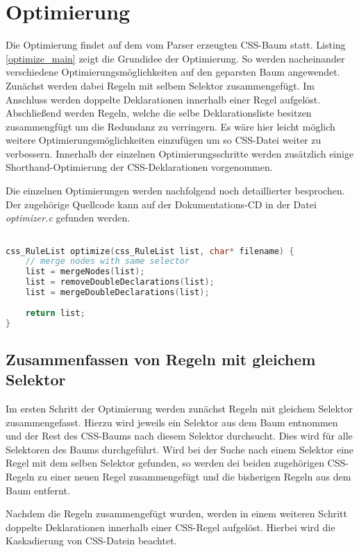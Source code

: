 \section{Optimierung}\label{chap_optimization}
Die Optimierung findet auf dem vom Parser erzeugten CSS-Baum statt. Listing \ref{optimize_main} zeigt die Grundidee der Optimierung. So werden nacheinander verschiedene Optimierungsmöglichkeiten auf den geparsten Baum angewendet.
Zunächst werden dabei Regeln mit selbem Selektor zusammengefügt. Im Anschluss werden doppelte Deklarationen innerhalb einer Regel aufgelöst. Abschließend werden Regeln, welche die selbe Deklarationsliste besitzen zusammengfügt um die Redundanz zu verringern.
Es wäre hier leicht möglich weitere Optimierungsmöglichkeiten einzufügen um so CSS-Datei weiter zu verbessern.
Innerhalb der einzelnen Optimierungsschritte werden zusätzlich einige Shorthand-Optimierung der CSS-Deklarationen vorgenommen.

Die einzelnen Optimierungen werden nachfolgend noch detaillierter besprochen. Der zugehörige Quellcode kann auf der Dokumentations-CD in der Datei \textit{optimizer.c} gefunden werden.


\begin{lstlisting}[label=optimize_main,language=C, caption=Optimize-Funktion]

css_RuleList optimize(css_RuleList list, char* filename) {
	// merge nodes with same selector
	list = mergeNodes(list);
	list = removeDoubleDeclarations(list);
	list = mergeDoubleDeclarations(list);
	
	return list;
}

\end{lstlisting}


\subsection{Zusammenfassen von Regeln mit gleichem Selektor}
Im ersten Schritt der Optimierung werden zunächst Regeln mit gleichem Selektor zusammengefasst. Hierzu wird jeweils ein Selektor aus dem Baum entnommen und der Rest des CSS-Baums nach diesem Selektor durchsucht. Dies wird für alle Selektoren des Baums durchgeführt.
Wird bei der Suche nach einem Selektor eine Regel mit dem selben Selektor gefunden, so werden dei beiden zugehörigen CSS-Regeln zu einer neuen Regel zusammengefügt und die bisherigen Regeln aus dem Baum entfernt.

Nachdem die Regeln zusammengefügt wurden, werden in einem weiteren Schritt doppelte Deklarationen innerhalb einer CSS-Regel aufgelöst. Hierbei wird die Kaskadierung von CSS-Datein beachtet.

